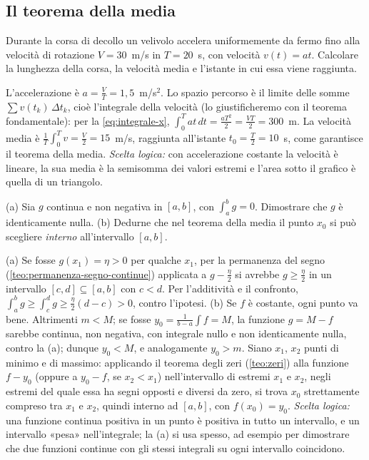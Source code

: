 \subsection*{Il teorema della media}

\begin{esercizio}
Durante la corsa di decollo un velivolo accelera uniformemente da fermo fino alla
velocità di rotazione $V=30$~m/s in $T=20$~s, con velocità $v(t)=at$. Calcolare la
lunghezza della corsa, la velocità media e l'istante in cui essa viene raggiunta.
\begin{soluzione}
L'accelerazione è $a=\frac VT=1{,}5$~m/s$^{2}$. Lo spazio percorso è il limite delle
somme $\sum v(t_{k})\,\Delta t_{k}$, cioè l'integrale della velocità (lo giustificheremo
con il teorema fondamentale): per la \eqref{eq:integrale-x},
$\int_{0}^{T}at\,dt=\frac{aT^{2}}2=\frac{VT}2=300$~m. La velocità media è
$\frac1T\int_{0}^{T}v=\frac V2=15$~m/s, raggiunta all'istante $t_{0}=\frac T2=10$~s,
come garantisce il teorema della media. \emph{Scelta logica:} con accelerazione costante
la velocità è lineare, la sua media è la semisomma dei valori estremi e l'area sotto il
grafico è quella di un triangolo.
\end{soluzione}
\end{esercizio}

\begin{esercizio}\label{es:media-interno}
(a) Sia $g$ continua e non negativa in $[a,b]$, con $\int_{a}^{b}g=0$. Dimostrare che $g$
è identicamente nulla. (b) Dedurne che nel teorema della media il punto $x_{0}$ si può
scegliere \emph{interno} all'intervallo $[a,b]$.
\begin{soluzione}
(a) Se fosse $g(x_{1})=\eta>0$ per qualche $x_{1}$, per la permanenza del segno
(\cref{teo:permanenza-segno-continue}) applicata a $g-\frac\eta2$ si avrebbe
$g\ge\frac\eta2$ in un intervallo $[c,d]\subseteq[a,b]$ con $c<d$. Per l'additività e il
confronto, $\int_{a}^{b}g\ge\int_{c}^{d}g\ge\frac\eta2(d-c)>0$, contro l'ipotesi.
(b) Se $f$ è costante, ogni punto va bene. Altrimenti $m<M$; se fosse
$y_{0}=\frac1{b-a}\int f=M$, la funzione $g=M-f$ sarebbe continua, non negativa, con
integrale nullo e non identicamente nulla, contro la (a); dunque $y_{0}<M$, e
analogamente $y_{0}>m$. Siano $x_{1}$, $x_{2}$ punti di minimo e di massimo: applicando il
teorema degli zeri (\cref{teo:zeri}) alla funzione $f-y_{0}$ (oppure a $y_{0}-f$, se
$x_{2}<x_{1}$) nell'intervallo di estremi $x_{1}$ e $x_{2}$,
negli estremi del quale essa ha segni opposti e diversi da zero, si trova $x_{0}$
strettamente compreso tra $x_{1}$ e $x_{2}$, quindi interno ad $[a,b]$, con
$f(x_{0})=y_{0}$. \emph{Scelta logica:} una funzione continua positiva in un punto è
positiva in tutto un intervallo, e un intervallo «pesa» nell'integrale; la (a) si usa
spesso, ad esempio per dimostrare che due funzioni continue con gli stessi integrali
su ogni intervallo coincidono.
\end{soluzione}
\end{esercizio}

